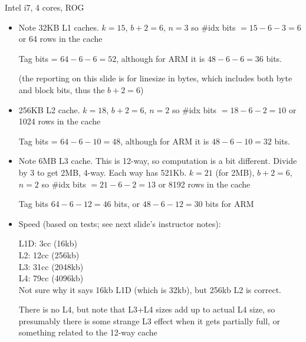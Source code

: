 


\begin{frame}[fragile]
Intel i7, 4 cores, ROG


\BNotes\ifnum{}
\begin{itemize}
      \item Note 32KB L1 caches. $k=15$, $b+2=6$, $n=3$ so \#idx bits $= 15-6-3=6$ or 64 rows in the cache

        Tag bits = $64-6-6=52$, although for ARM it is $48-6-6=36$ bits.

        (the reporting on this slide is for linesize in bytes, which includes both byte and block bits, thus the $b+2=6$)
        \item 256KB L2 cache.  $k=18$, $b+2=6$, $n=2$ so \#idx bits $=18-6-2=10$ or 1024 rows in the cache

          Tag bits = $64-6-10=48$, although for ARM it is $48-6-10=32$ bits.

        \item Note 6MB L3 cache.  This is 12-way, so computation is a bit
          different.  Divide by 3 to get 2MB, 4-way.  Each way has 521Kb.
          $k=21$ (for 2MB), $b+2=6$, $n=2$ so \#idx bits $=21-6-2=13$ or 8192 rows in the cache

          Tag bits $64-6-12=46$ bits, or $48-6-12=30$ bits for ARM

\item Speed (based on tests; see next slide's instructor notes):

		L1D: 3cc (16kb)\\
		L2: 12cc (256kb)\\
		L3: 31cc (2048kb)\\
		L4: 79cc (4096kb)\\

                Not sure why it says 16kb L1D (which is 32kb),
                but 256kb L2 is correct.

                There is no L4, but note that L3+L4 sizes add up to
                actual L4 size, so presumably there is some strange
                L3 effect when it gets partially full, or something
                related to the 12-way cache
\end{itemize}
\fi\ENotes
\end{frame}


